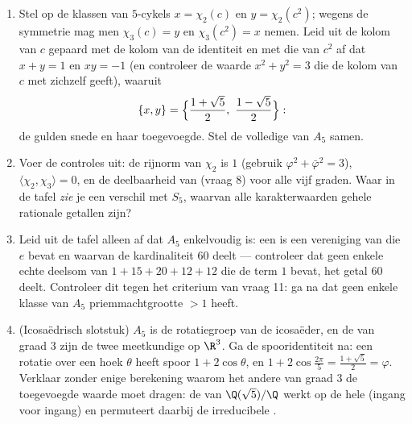 \begin{problem}
\begin{enumerate}[resume]
        kolom met zichzelf) legt hun waarden buiten de $5$-cykels
        vast: toon aan dat $\chi_2(g) = \chi_3(g) = -1$ op de
        dubbele transposities en $0$ op de drietallige cykels.
  \item Stel op de klassen van $5$-cykels $x = \chi_2(c)$ en $y =
        \chi_2(c^2)$; wegens de symmetrie mag men $\chi_3(c) = y$
        en $\chi_3(c^2) = x$ nemen. Leid uit de kolom van $c$
        gepaard met de kolom van de identiteit en met die van
        $c^2$ af dat $x + y = 1$ en $xy = -1$ (en controleer de
        waarde $x^2 + y^2 = 3$ die de kolom van $c$ met zichzelf
        geeft), waaruit
        \[
        \{x, y\} = \Bigl\{\frac{1 + \sqrt5}2,\ \frac{1 -
        \sqrt5}2\Bigr\} :
        \]
        de gulden snede en haar toegevoegde. Stel de volledige
         van $A_5$ samen.
  \item Voer de controles uit: de rijnorm van $\chi_2$ is $1$
        (gebruik $\varphi^2 + \bar\varphi^2 = 3$),
        $\langle\chi_2, \chi_3\rangle = 0$, en de deelbaarheid van
         (vraag 8) voor alle vijf graden. Waar in de
        tafel \emph{zie} je een verschil met $S_5$, waarvan alle
        karakterwaarden gehele rationale getallen zijn?
  \item Leid uit de tafel alleen af dat $A_5$ enkelvoudig is: een
         is een vereniging van  die
        $e$ bevat en waarvan de kardinaliteit $60$ deelt ---
        controleer dat geen enkele echte deelsom van $1 + 15 + 20
        + 12 + 12$ die de term $1$ bevat, het getal $60$ deelt.
        Controleer dit tegen het criterium van vraag 11: ga na dat
        geen enkele klasse van $A_5$ priemmachtgrootte $> 1$
        heeft.
  \item (Icosaëdrisch slotstuk) $A_5$ is de rotatiegroep van de
        icosaëder, en de  van graad $3$ zijn de twee
        meetkundige  op $\R^3$. Ga de spooridentiteit na:
        een rotatie over een hoek $\theta$ heeft spoor $1 +
        2\cos\theta$, en $1 + 2\cos\frac{2\pi}5 =
        \frac{1+\sqrt5}2 = \varphi$. Verklaar zonder enige
        berekening waarom het andere  van graad $3$ de
        toegevoegde waarde moet dragen: de  van
        $\Q(\sqrt5)/\Q$ werkt op de hele  (ingang
        voor ingang) en permuteert daarbij de irreducibele
        .
\end{enumerate}


\end{problem}
